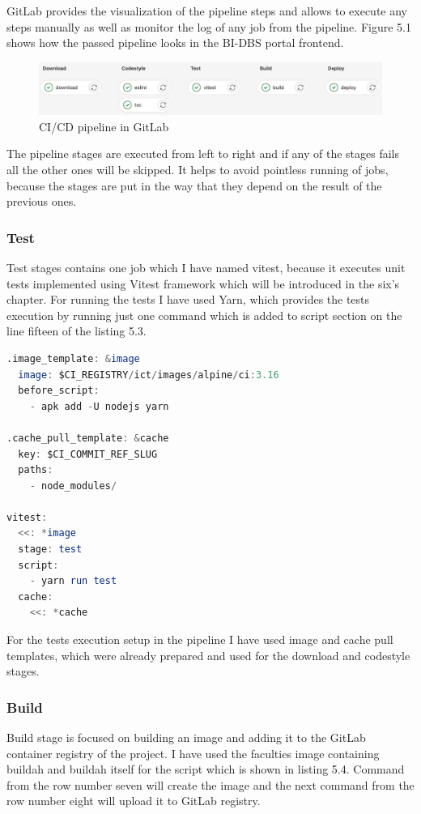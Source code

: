 \noindent GitLab provides the visualization of the pipeline steps and allows to execute any steps manually as well as monitor the log of any job from the pipeline. Figure 5.1 shows how the passed pipeline looks in the BI-DBS portal frontend.

\begin{figure}[ht]
\centering
\includegraphics[scale=0.377]{../png/pipeline.png}
\caption{CI/CD pipeline in GitLab}
\end{figure}

\noindent The pipeline stages are executed from left to right and if any of the stages fails all the other ones will be skipped. It helps to avoid pointless running of jobs, because the stages are put in the way that they depend on the result of the previous ones. 




\subsubsection{Test} Test stages contains one job which I have named vitest, because it executes unit tests implemented using Vitest framework which will be introduced in the six's chapter. For running the tests I have used Yarn, which provides the tests execution by running just one command which is added to script section on the line fifteen of the listing 5.3. 
\begin{lstlisting}[language=Octave, caption=Test stage in the CI/CD pipeline]
.image_template: &image
  image: $CI_REGISTRY/ict/images/alpine/ci:3.16
  before_script:
    - apk add -U nodejs yarn

.cache_pull_template: &cache
  key: $CI_COMMIT_REF_SLUG
  paths:
    - node_modules/
    
vitest:
  <<: *image
  stage: test
  script:
    - yarn run test
  cache:
    <<: *cache

\end{lstlisting}

\noindent For the tests execution setup in the pipeline I have used image and cache pull templates, which were already prepared and used for the download and codestyle stages.




\subsubsection{Build} Build stage is focused on building an image and adding it to the GitLab container registry of the project. I have used the faculties image containing buildah and buildah itself for the script which is shown in listing 5.4. Command from the row number seven will create the image and the next command from the row number eight will upload it to GitLab registry.\\

